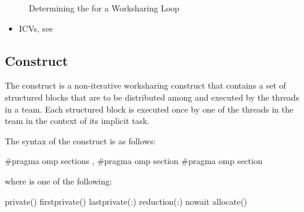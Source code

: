
\begin{figure}[h]
\begin{quote} %

\end{quote}
\caption{Determining the  for a Worksharing Loop\label{fig:schedule loop}}
\end{figure}

\crossreferences
\begin{itemize}
\item ICVs, see 
\end{itemize}











\subsection{ Construct}
\label{subsec:sections Construct}
\summary
The  construct is a non-iterative worksharing construct that contains a set of 
structured blocks that are to be distributed among and executed by the threads in a team. 
Each structured block is executed once by one of the threads in the team in the context 
of its implicit task.

\syntax
\begin{ccppspecific}
The syntax of the  construct is as follows:

\begin{ompcPragma}
#pragma omp sections \plc{[clause[ [},\plc{] clause] ... ] new-line}
   {
   \plc{[}#pragma omp section \plc{]}
   \plc{[}#pragma omp section 
      \plc{structured-block]}
   }
\end{ompcPragma}

where  is one of the following: 

\begin{indentedcodelist}
private()
firstprivate()
lastprivate(\plc{[ lastprivate-modifier}:\plc{] list})
reduction(:)
nowait
allocate(\plc{[allocator: ]})
\end{indentedcodelist}
\end{ccppspecific}

